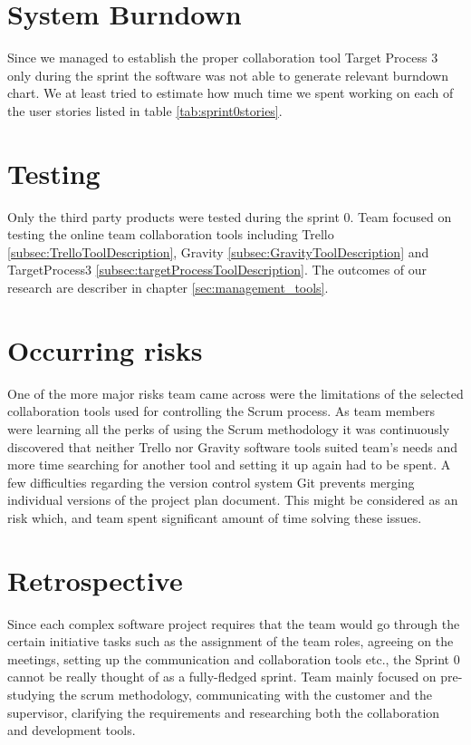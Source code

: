 \section{System Burndown}
Since we managed to establish the proper collaboration tool Target Process 3 only during the sprint the software was not able to generate relevant burndown chart.
We at least tried to estimate how much time we spent working on each of the user stories listed in table \ref{tab:sprint0stories}.

\section{Testing}

Only the third party products were tested during the sprint 0. Team focused on testing the online team collaboration tools including Trello \ref{subsec:TrelloToolDescription}, Gravity \ref{subsec:GravityToolDescription} and TargetProcess3 \ref{subsec:targetProcessToolDescription}. The outcomes of our research are describer in chapter \ref{sec:management_tools}.

\section{Occurring risks}

One of the more major risks team came across were the limitations of the selected collaboration tools used for controlling the Scrum process. As team members were learning all the perks of using the Scrum methodology it was continuously discovered that neither Trello nor Gravity software tools suited team's needs and more time searching for another tool and setting it up again had to be spent. A few difficulties regarding the version control system Git prevents merging individual versions of the project plan document. This might be considered as an risk which, and team spent significant amount of time solving these issues.

\section{Retrospective}

Since each complex software project requires that the team would go through the certain initiative tasks such as the assignment of the team roles, agreeing on the meetings, setting up the communication and collaboration tools etc., the Sprint 0 cannot be really thought of as a fully-fledged sprint. Team mainly focused on pre-studying the scrum methodology, communicating with the customer and the supervisor, clarifying the requirements and researching both the collaboration and development tools.

